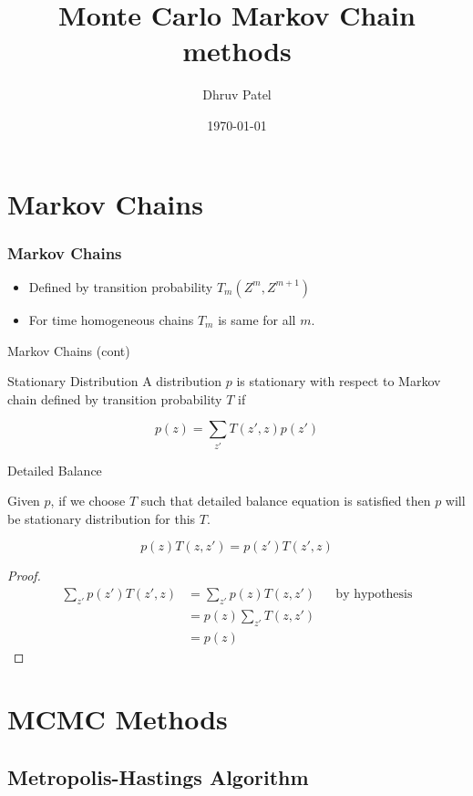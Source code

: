 \documentclass[pdf]{beamer}
\title{Monte Carlo Markov Chain methods}
\author{Dhruv Patel}
\institute{Myntra}
\date{\today}
\begin{document}
\begin{frame}
  \titlepage
\end{frame}

\section{Markov Chains}
\begin{frame}
  \frametitle{Markov Chains}
  \begin{itemize}
  \item  Defined by transition probability $T_m(Z^m, Z^{m+1})$
  \item For time homogeneous chains $T_m$ is same for all $m$.
  \end{itemize}
\end{frame}

\begin{frame}{Markov Chains (cont)}
  \begin{block}{Stationary Distribution}
    A distribution $p$ is stationary with respect to Markov chain defined by transition probability $T$ if
    
    \[
      p(z) = \sum_{z'}T(z', z) p(z')
    \]
  \end{block}
\end{frame}

\begin{frame}{Detailed Balance}

  \begin{theorem}
    Given $p$, if we choose $T$ such that detailed balance equation is satisfied then $p$ will be stationary distribution for this $T$.
    
    \[
      p(z)T(z, z') = p(z')T(z', z)  
    \]
  \end{theorem}
  \begin{proof}
    \begin{align*}
      \sum_{z'} p(z') T(z', z) &= \sum_{z'} p(z) T(z, z')  && \text{by hypothesis} \\
                               &= p(z) \sum_{z'}T(z, z') \\
                               &= p(z)
    \end{align*}
  \end{proof}
\end{frame}

\section{MCMC Methods}
\subsection{Metropolis-Hastings Algorithm}
\end{document}
